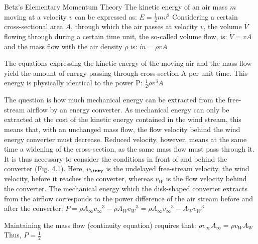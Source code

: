 Betz’s Elementary Momentum Theory
The kinetic energy of an air mass $m$ moving at a velocity $v$ can be expressed as:
$E = \frac{1}{2}mv^2$
Considering a certain cross-sectional area $A$, through which the air passes at velocity $v$, the volume $\dot{V̇}$ flowing through during a certain time unit, the so-called volume flow, is:
$\dot{V} = vA$
and the mass flow with the air density $\rho$ is:
$\dot{m} = \rho v A $

The equations expressing the kinetic energy of the moving air and the mass flow yield the amount of energy passing through cross-section A per unit time. This energy is physically identical to the power P:
$\frac{1}{2}\rho {v}^3 A $

The question is how much mechanical energy can be extracted from the free-stream airflow by an energy converter. As mechanical energy can only be extracted at the cost of the kinetic energy contained in the wind stream, this means that, with an unchanged mass flow, the flow velocity behind the wind energy converter must decrease. Reduced velocity, however, means at the same time a widening of the cross-section, as the same mass flow must pass through it. It is thus necessary to consider the conditions in front of and behind the converter (Fig. 4.1).
Here, $v_{\inty}$ is the undelayed free-stream velocity, the wind velocity, before it reaches the converter, whereas $v_{W}$ is the flow velocity behind the converter. The mechanical energy which the disk-shaped converter extracts from the airflow corresponds to the power difference of the air stream before and after the converter:
$P = \rho A_{\infty} {v_{\infty}}^3 − \rho A_W {v_W}^3 = \rho A_{\infty} {v_{\infty}}^3 − A_W {v_W}^3$

Maintaining the mass flow (continuity equation) requires that:
$\rho v_{\infty} A_{\infty} = \rho v_{W} A_{W}$
Thus,
$P = \frac{1}{2}$




